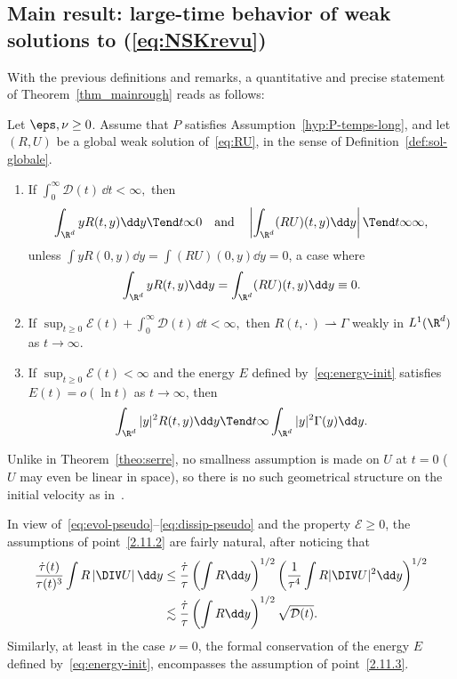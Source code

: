 \subsection{Main result: large-time behavior of weak solutions to (\ref{eq:NSKrevu})}

With the previous definitions and remarks, a quantitative and precise statement of Theorem~\ref{thm_mainrough} reads as follows:

\goodbreak
\begin{theo}\label{theo:temps-long}
Let $\eps,\nu\ge 0$. Assume that $P$ satisfies Assumption~\ref{hyp:P-temps-long}, and let $(R,U)$ be a global weak solution of~\eqref{eq:RU}, in the sense of Definition~\ref{def:sol-globale}.
\begin{enumerate}%
\item \label{2.11.1} If $\int_0^\infty \mathcal D(t) \, \dd t < \infty,$ then
\[
\int_{\R^d} yR(t,y)\dd y\Tend t \infty 0\quad \text{and}\quad \left|\int_{\R^d} (RU)(t,y)\dd y\right|\Tend t \infty \infty,
\]
unless $\int y R(0,y)\dd y= \int (RU)(0,y)\dd y =0$, a case where
\[
\int_{\R^d} yR(t,y)\dd y=\int_{\R^d} (RU)(t,y)\dd y\equiv 0.
\]

\item \label{2.11.2} If $
\sup_{t \ge 0} \mathcal E(t) + \int_0^\infty \mathcal D(t) \, \dd t < \infty,$ then $R(t, \cdot\,) \rightharpoonup \Gamma$ weakly in $L^1(\R^d)$ as $ t \to \infty$.

\item \label{2.11.3} If $
\sup_{t \ge 0} \mathcal E(t) < \infty$ and the energy $E$ defined by~\eqref{eq:energy-init} satisfies $E(t)=o\left(\ln t\right)$ as $t\to \infty$, then
\begin{equation*}
\int_{\R^d}|y|^2R(t,y) \dd y \Tend t \infty \int_{\R^d}|y|^2 \Gamma(y) \dd y.
\end{equation*}
\end{enumerate}
\end{theo}

\begin{rema}
Unlike in Theorem~\ref{theo:serre}, no smallness assumption is made on $U$ at $t=0$ ($U$ may even be linear in space), so there is no such geometrical structure on the initial velocity as in~\cite{Serre97,Gra98}.
\end{rema}

\begin{rema}\label{rem:hyp-naturelles}
In view of~\eqref{eq:evol-pseudo}--\eqref{eq:dissip-pseudo} and the property $\mathcal E\ge 0$, the assumptions of point~\eqref{2.11.2} are fairly natural, after noticing that
\begin{align*}
\frac{\dot
\tau(t)}{\tau(t)^3} \int R \left| \DIV U\right|\dd y & \le
\frac{\dot \tau}{\tau}\left(\int R\dd y\right)^{1/2} \left(\frac{1}{\tau^4}\int R|\DIV U|^2\dd y\right)^{1/2}\\
&\lesssim \frac{\dot \tau}{\tau}\left(\int R\dd y\right)^{1/2} \sqrt{\mathcal D(t)}.
\end{align*}
Similarly, at least in the case $\nu=0$, the formal conservation of the energy $E$ defined by~\eqref{eq:energy-init}, encompasses the assumption of point~\eqref{2.11.3}.
\end{rema}

